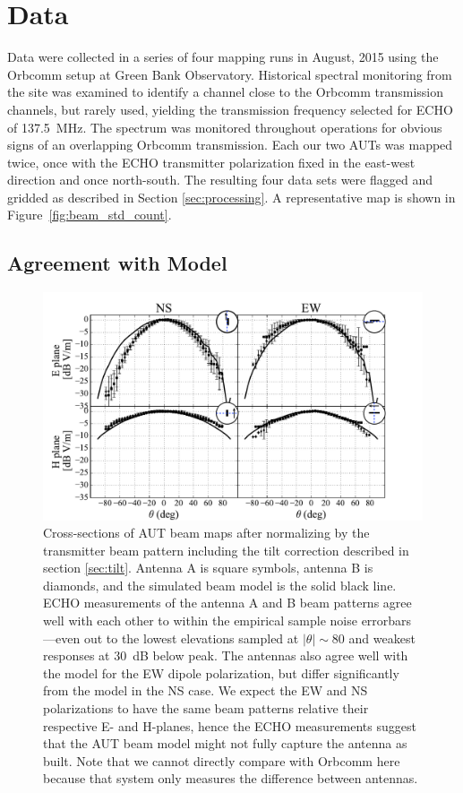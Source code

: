 \documentclass[preprint2,numberedappendix,tighten,twocolappendix]{aastex6}
\begin{document}
\section{Data}
\label{sec:data}

Data were collected in a series of four mapping runs in August, 2015 using the Orbcomm setup at Green Bank Observatory.   Historical spectral monitoring from the site was examined to identify a channel close to the Orbcomm transmission channels, but rarely used, yielding the transmission frequency selected for ECHO of 137.5~MHz.  The spectrum was monitored throughout operations for obvious signs of an overlapping Orbcomm transmission.  Each our two AUTs was mapped twice, once with the ECHO transmitter polarization fixed in the east-west direction and once north-south.  The resulting four data sets were flagged and gridded as described in Section \ref{sec:processing}.  A representative map is shown in Figure~\ref{fig:beam_std_count}. 





\subsection{Agreement with Model}

\begin{figure}
\includegraphics[width=\columnwidth]{figures/GB_slices_quad.pdf}
\caption{Cross-sections of AUT beam maps after normalizing by the transmitter beam pattern including the tilt correction described in section \ref{sec:tilt}.  Antenna A is square symbols, antenna B is diamonds, and the simulated beam model is the solid black line.  ECHO measurements of the antenna A and B beam patterns agree well with each other to within the empirical sample noise errorbars---even out to the lowest elevations sampled at $|\theta|\sim80$\arcdeg{} and weakest responses at 30~dB below peak.  The antennas also agree well with the model for the EW dipole polarization, but differ significantly from the model in the NS case.  We expect the EW and NS polarizations to have the same beam patterns relative their respective E- and H-planes, hence the ECHO measurements suggest that the AUT beam model might not fully capture the antenna as built.  Note that we cannot directly compare with Orbcomm here because that system only measures the difference between antennas. \label{fig:GB_slices_quad}}
\end{figure}
\end{document}
